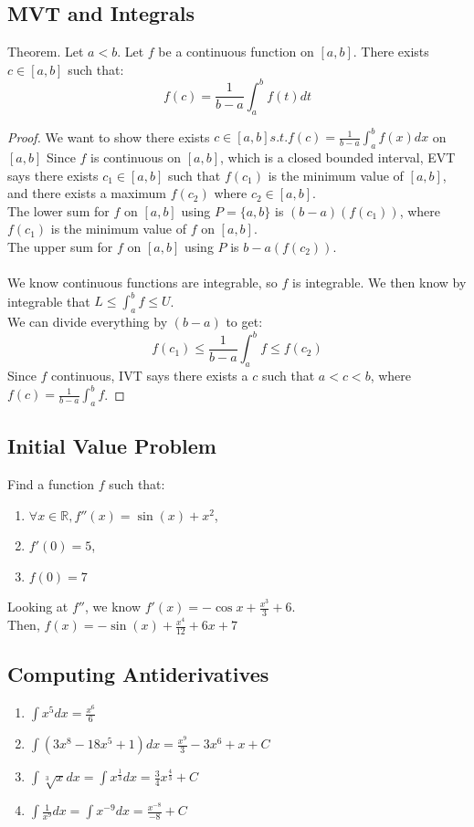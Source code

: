 \documentclass{article}
\begin{document}
\subsection{MVT and Integrals}
Theorem. Let $a < b$. Let $f$ be a continuous function on $[a,b]$. There exists $c \in [a,b]$ such that:
$$f(c) = \frac{1}{b-a}\int_{a}^{b}f(t)dt$$
\begin{proof}
    We want to show there exists $c \in [a,b] s.t. f(c) = \frac{1}{b-a} \int_a^bf(x)dx$ on $[a,b]$
    Since $f$ is continuous on $[a,b]$, which is a closed bounded interval, EVT says there exists $c_1 \in [a,b]$ such that $f(c_1)$ is the minimum value of $[a,b]$, and there exists a maximum $f(c_2)$ where $c_2 \in [a,b]$.\\
    The lower sum for $f$ on $[a,b]$ using $P = \{a,b\}$ is $(b-a)(f(c_1))$, where $f(c_1)$ is the minimum value of $f$ on $[a,b]$.\\
    The upper sum for $f$ on $[a,b]$ using $P$ is $b-a(f(c_2))$.\\\\
    We know continuous functions are integrable, so $f$ is integrable. We then know by integrable that $L \leq \int_a^bf \leq U$.\\
    We can divide everything by $(b-a)$ to get:
    $$f(c_1) \leq \frac{1}{b-a} \int_a^bf \leq f(c_2)$$
    Since $f$ continuous, IVT says there exists a $c$ such that $a < c < b$, where $f(c) = \frac{1}{b-a} \int_a^b f$.
\end{proof}

\subsection{Initial Value Problem}
Find a function $f$ such that:
\begin{enumerate}
    \item $\forall x \in \mathbb{R}, f''(x) = \sin(x) + x^2$,
    \item $f'(0) = 5$,
    \item $f(0) = 7$
\end{enumerate}
Looking at $f''$, we know $f'(x) = -\cos x + \frac{x^3}{3} + 6$.\\
Then, $f(x) = -\sin(x) + \frac{x^4}{12} + 6x + 7$

\subsection{Computing Antiderivatives}
\begin{enumerate}
    \item $\int x^5 dx = \frac{x^6}{6}$
    \item $\int (3x^8 - 18x^5 + 1) dx = \frac{x^9}{3} - 3x^6 + x + C$
    \item $\int \sqrt[3]{x}dx = \int x^{\frac{1}{3}}dx = \frac{3}{4}x^{\frac{4}{3}} + C$
    \item $\int \frac{1}{x^9}dx = \int x^{-9} dx = \frac{x^{-8}}{-8} + C$ 
\end{enumerate}
\end{document}
